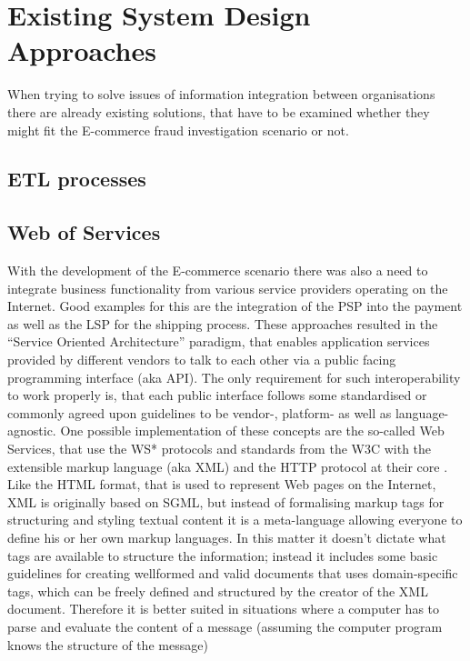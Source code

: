 
\section{Existing System Design Approaches}
\label{sec:system_approaches}

When trying to solve issues of information integration between organisations there are already existing solutions, that have to be examined whether they might fit the E-commerce fraud investigation scenario or not.

\subsection{\gls{ETL} processes}
\label{subsec:etl_process}




\subsection{Web of Services}
\label{subsec:web_services}

With the development of the E-commerce scenario there was also a need to integrate business functionality from various service providers operating on the Internet. Good examples for this are the integration of the \gls{PSP} into the payment as well as the \gls{LSP} for the shipping process. These approaches resulted in the ``Service Oriented Architecture'' paradigm, that enables application services provided by different vendors to talk to each other via a public facing programming interface (aka \gls{API}). The only requirement for such interoperability to work properly is, that each public interface follows some standardised or commonly agreed upon guidelines to be vendor-, platform- as well as language-agnostic. One possible implementation of these concepts are the so-called Web Services, that use the WS* protocols and standards from the \gls{W3C} with the extensible markup language (aka \gls{XML}) and the \gls{HTTP} protocol at their core \citep{josuttis2007soa}. \\

Like the \gls{HTML} format, that is used to represent Web pages on the Internet, \gls{XML} is originally based on \gls{SGML}, but instead of formalising markup tags for structuring and styling textual content it is a meta-language allowing everyone to define his or her own markup languages. In this matter it doesn’t dictate what tags are available to structure the information; instead it includes some basic guidelines for creating wellformed and valid documents that uses domain-specific tags, which can be freely defined and structured by the creator of the XML document. Therefore it is better suited in situations where a computer has to parse and evaluate the content of a message (assuming the computer program knows the structure of the message) \\


